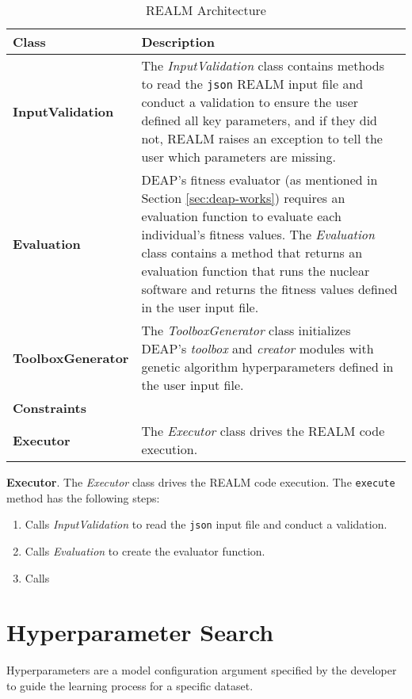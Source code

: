 \begin{table}[]
    \centering
    \onehalfspacing
    \caption{REALM Architecture}
	\label{tab:realm-architecture}
    \small
    \begin{tabular}{l|p{}}
    \hline
    \textbf{Class} & \textbf{Description} \\ \hline
    \textbf{InputValidation} & The \textit{InputValidation} class contains methods 
    to read the \texttt{json} \gls{REALM} input file and conduct a validation to 
    ensure the user defined all key parameters, and if they did not, \gls{REALM} 
    raises an exception to tell the user which parameters are missing. \\
    \hline
    \textbf{Evaluation} & \gls{DEAP}'s fitness evaluator (as mentioned in Section 
    \ref{sec:deap-works}) requires an evaluation function to evaluate each 
    individual's fitness values. 
    The \textit{Evaluation} class contains a method that returns an evaluation 
    function that runs the nuclear software and returns the fitness values defined 
    in the user input file. \\
    \hline 
    \textbf{ToolboxGenerator} & The \textit{ToolboxGenerator} class initializes
    DEAP's \textit{toolbox} and \textit{creator} modules with genetic algorithm 
    hyperparameters defined in the user input file.\\
    \hline
    \textbf{Constraints} & \\
    \hline 
    \textbf{Executor} & The \textit{Executor} class drives the \gls{REALM} code
    execution. \\
    \hline
    \end{tabular}
    \end{table}


\vspace{0.2cm} 
\noindent
\textbf{Executor}. The \textit{Executor} class drives the \gls{REALM} code
execution. 
The \texttt{execute} method has the following steps: 
\begin{enumerate}
    \item Calls \textit{InputValidation} to read the \texttt{json} input file 
    and conduct a validation.
    \item Calls \textit{Evaluation} to create the evaluator function. 
    \item Calls \textit{}
\end{enumerate}

\section{Hyperparameter Search}
Hyperparameters are a model configuration argument specified by the developer to 
guide the learning process for a specific dataset. 